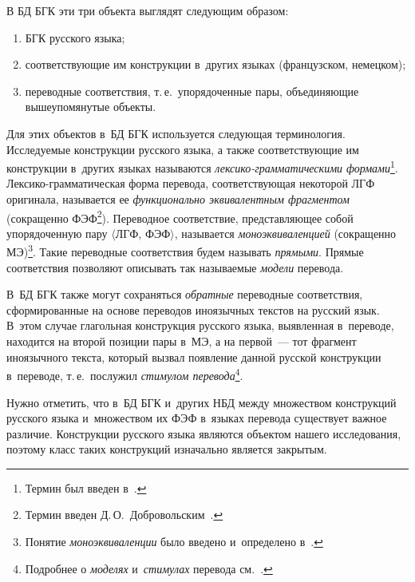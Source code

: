 \begin{multicols}{2}
  В БД БГК эти три объекта выглядят следующим образом:
  \begin{enumerate}[(1)]
\item БГК русского языка;
\item соответствующие им конструкции в~других языках (французском, 
немецком);
\item переводные соответствия, т.\,е.\ упорядоченные пары, объединяющие 
вышеупомянутые объ\-екты. 
\end{enumerate}

  Для этих объектов в~БД БГК используется следующая терминология. 
Исследуемые конструкции русского языка, а также соответствующие им 
конструкции в~других языках называются  
\textit{лек\-си\-ко-грам\-ма\-ти\-че\-ски\-ми формами}\footnote{Термин был введен в~\cite{12-kr}.}. 
Лек\-си\-ко-грам\-ма\-ти\-че\-ская форма перевода, 
соответствующая некоторой ЛГФ оригинала, называется ее 
\textit{функционально эквивалентным фрагментом} (сокращенно 
ФЭФ\footnote{Термин введен Д.\,О.~Добровольским~\cite{13-kr, 14-kr}.}). 
Переводное соответствие, представляющее собой упорядоченную пару 
$\langle$ЛГФ, ФЭФ$\rangle$, называется \textit{моноэквиваленцией} 
(сокращенно МЭ)\footnote{Понятие \textit{моноэквиваленции} было введено 
и~определено в~\cite{7-kr}.}. Такие переводные соответствия будем называть 
\textit{прямыми}. Прямые соответствия позволяют описывать так называемые 
\textit{модели} перевода. 

В~БД БГК также могут сохраняться \textit{обратные} 
переводные соответствия, сформированные на основе переводов иноязычных 
текстов на русский язык. В~этом случае глагольная конструкция русского 
языка, выявленная в~переводе, находится на второй позиции пары в~МЭ, а на 
первой~--- тот фрагмент иноязычного текста, который вызвал появление 
данной русской конструкции в~переводе, т.\,е.\ послужил \textit{стимулом 
перевода}\footnote{Подробнее о \textit{моделях} и~\textit{стимулах} перевода 
см.~\cite[с.~102]{8-kr}.}.
  
  Нужно отметить, что в~БД БГК и~других НБД между множеством 
конструкций русского языка и~множеством их ФЭФ в~языках перевода 
существует важное различие. Конструкции русского языка являются объектом 
нашего исследования, поэтому класс таких конструкций изначально является 
закрытым. 


\end{multicols}
